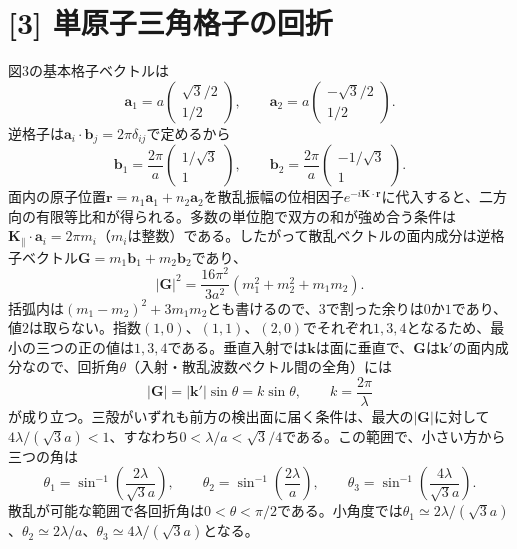 \documentclass[11pt,a4paper]{article}
\begin{document}
\section*{[3] 単原子三角格子の回折}
図3の基本格子ベクトルは
\begin{equation}
 \boldsymbol a_1=a\begin{pmatrix}\sqrt3/2\\1/2\end{pmatrix},\qquad
 \boldsymbol a_2=a\begin{pmatrix}-\sqrt3/2\\1/2\end{pmatrix}.
\end{equation}
逆格子は$\boldsymbol a_i\cdot\boldsymbol b_j=2\pi\delta_{ij}$で定めるから
\begin{equation}
 \boxed{\boldsymbol b_1=\frac{2\pi}{a}\begin{pmatrix}1/\sqrt3\\1\end{pmatrix},\qquad
 \boldsymbol b_2=\frac{2\pi}{a}\begin{pmatrix}-1/\sqrt3\\1\end{pmatrix}}.
\end{equation}
面内の原子位置$\boldsymbol r=n_1\boldsymbol a_1+n_2\boldsymbol a_2$を散乱振幅の位相因子$e^{-i\boldsymbol K\cdot\boldsymbol r}$に代入すると、二方向の有限等比和が得られる。多数の単位胞で双方の和が強め合う条件は$\boldsymbol K_{\parallel}\cdot\boldsymbol a_i=2\pi m_i$（$m_i$は整数）である。したがって散乱ベクトルの面内成分は逆格子ベクトル$\boldsymbol G=m_1\boldsymbol b_1+m_2\boldsymbol b_2$であり、
\begin{equation}
 |\boldsymbol G|^2=\frac{16\pi^2}{3a^2}
 (m_1^2+m_2^2+m_1m_2).
\end{equation}
括弧内は$(m_1-m_2)^2+3m_1m_2$とも書けるので、3で割った余りは$0$か$1$であり、値$2$は取らない。指数$(1,0)$、$(1,1)$、$(2,0)$でそれぞれ$1,3,4$となるため、最小の三つの正の値は$1,3,4$である。垂直入射では$\boldsymbol k$は面に垂直で、$\boldsymbol G$は$\boldsymbol k'$の面内成分なので、回折角$\theta$（入射・散乱波数ベクトル間の全角）には
\begin{equation}
 |\boldsymbol G|=|\boldsymbol k'|\sin\theta=k\sin\theta,\qquad k=\frac{2\pi}{\lambda}
\end{equation}
が成り立つ。三殻がいずれも前方の検出面に届く条件は、最大の$|\boldsymbol G|$に対して$4\lambda/(\sqrt3a)<1$、すなわち$0<\lambda/a<\sqrt3/4$である。この範囲で、小さい方から三つの角は
\begin{equation}
 \boxed{\theta_1=\sin^{-1}\!\left(\frac{2\lambda}{\sqrt3a}\right),\qquad
 \theta_2=\sin^{-1}\!\left(\frac{2\lambda}{a}\right),\qquad
 \theta_3=\sin^{-1}\!\left(\frac{4\lambda}{\sqrt3a}\right)}.
\end{equation}
散乱が可能な範囲で各回折角は$0<\theta<\pi/2$である。小角度では$\theta_1\simeq2\lambda/(\sqrt3a)$、$\theta_2\simeq2\lambda/a$、$\theta_3\simeq4\lambda/(\sqrt3a)$となる。
\end{document}
